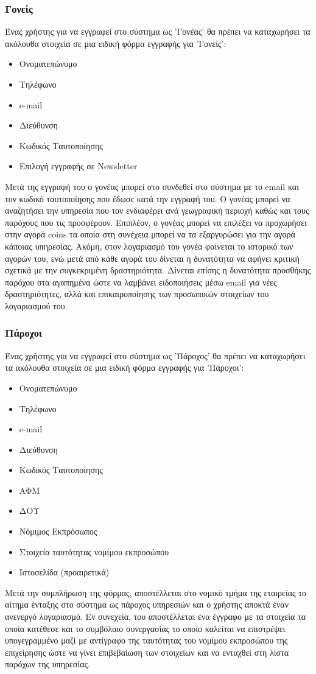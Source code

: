 \documentclass[letterpaper,6pt]{article}
\begin{document}
\subsubsection{Γονείς}
Ένας χρήστης για να εγγραφεί στο σύστημα ως 'Γονέας' θα πρέπει να καταχωρήσει τα ακόλουθα στοιχεία σε μια ειδική φόρμα εγγραφής για 'Γονείς':
\begin{itemize}
  \item Ονοματεπώνυμο
  \item Τηλέφωνο
  \item e-mail
  \item Διεύθυνση
  \item Κωδικός Ταυτοποίησης
  \item Επιλογή εγγραφής σε Newsletter
\end{itemize}
Μετά της εγγραφή του ο γονέας μπορεί στο συνδεθεί στο σύστημα με το email και τον κωδικό ταυτοποίησης που έδωσε κατά την εγγραφή του. Ο γονέας μπορεί να αναζητήσει την υπηρεσία που τον ενδιαφέρει ανά γεωγραφική περιοχή καθώς και τους παρόχους που τις προσφέρουν. Επιπλέον, ο γονέας μπορεί να επιλέξει να προχωρήσει στην αγορά coins τα οποία στη συνέχεια μπορεί να τα εξαργυρώσει για την αγορά κάποιας υπηρεσίας. Ακόμη, στον λογαριασμό του γονέα φαίνεται το ιστορικό των αγορών του, ενώ μετά από κάθε αγορά του δίνεται η δυνατότητα να αφήνει κριτική σχετικά με την συγκεκριμένη δραστηριότητα. Δίνεται επίσης η δυνατότητα προσθήκης παρόχου στα αγαπημένα ώστε να λαμβάνει ειδοποιήσεις μέσω email για νέες δραστηριότητες, αλλά και επικαιροποίησης των προσωπικών στοιχείων του λογαριασμού του.
\subsubsection{Πάροχοι}
Ένας χρήστης για να εγγραφεί στο σύστημα ως 'Πάροχος' θα πρέπει να καταχωρήσει τα ακόλουθα στοιχεία σε μια ειδική φόρμα εγγραφής για 'Πάροχοι':
\begin{itemize}
  \item Ονοματεπώνυμο
  \item Τηλέφωνο
  \item e-mail
  \item Διεύθυνση
  \item Κωδικός Ταυτοποίησης
  \item ΑΦΜ
  \item ΔΟΥ
  \item Νόμιμος Εκπρόσωπος
  \item Στοιχεία ταυτότητας νομίμου εκπροσώπου
  \item Ιστοσελίδα (προαιρετικά)
\end{itemize}
Μετά την συμπλήρωση της φόρμας, αποστέλλεται στο νομικό τμήμα της εταιρείας το αίτημα ένταξης στο σύστημα ως πάροχος υπηρεσιών και ο χρήστης αποκτά έναν ανενεργό λογαριασμό. Εν συνεχεία, του αποστέλλεται ένα έγγραφο με τα στοιχεία τα οποία κατέθεσε και το συμβόλαιο συνεργασίας το οποίο καλείται να επιστρέψει υπογεγραμμένο μαζί με αντίγραφο της ταυτότητας του νομίμου εκπροσώπου της επιχείρησης ώστε να γίνει επιβεβαίωση των στοιχείων και να ενταχθεί στη λίστα παρόχων της υπηρεσίας.
\end{document}
